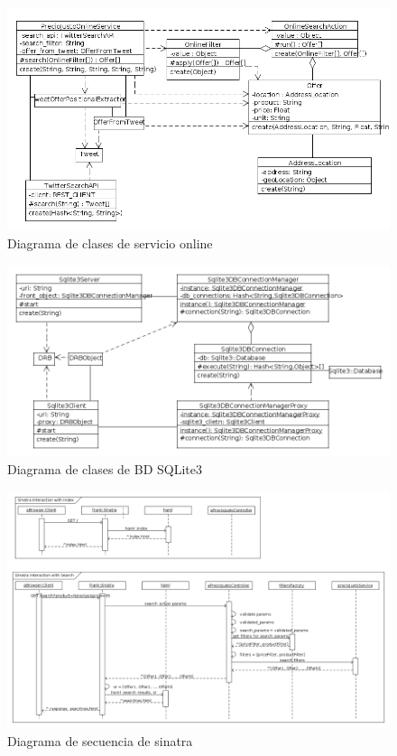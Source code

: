 \begin{figure}[ht]
\includegraphics[width=\textwidth]{./imgs/class_diagram_online_service.png}
\caption{Diagrama de clases de servicio online}
\end{figure}

\begin{figure}[ht]
\includegraphics[width=\textwidth]{./imgs/class_diagram_sqlite3_client_server.png}
\caption{Diagrama de clases de BD SQLite3}
\end{figure}

\begin{figure}[ht]
\includegraphics[width=0.8\paperwidth]{./imgs/sequence_diagram_sinatra.png}
\caption{Diagrama de secuencia de sinatra}
\end{figure}

